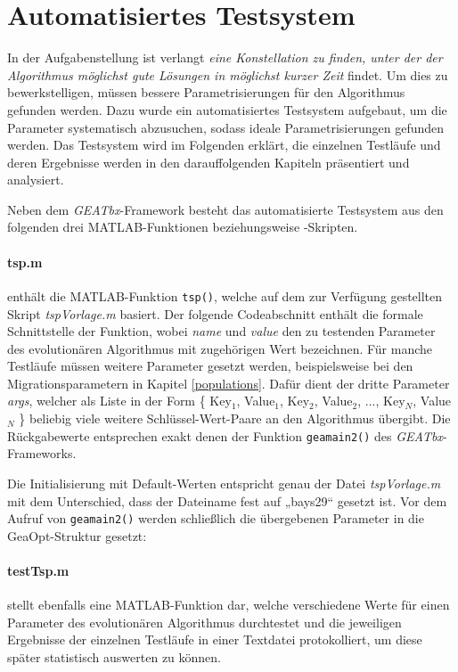 \section{Automatisiertes Testsystem}\label{testsystem}

In der Aufgabenstellung \citep{aufg} ist verlangt \emph{eine Konstellation zu finden,
unter der der Algorithmus möglichst gute Lösungen in möglichst kurzer Zeit} findet.
Um dies zu bewerkstelligen, müssen bessere Parametrisierungen für den Algorithmus
gefunden werden. Dazu wurde ein automatisiertes Testsystem aufgebaut, um
die Parameter systematisch abzusuchen, sodass ideale Parametrisierungen
gefunden werden. Das Testsystem wird im Folgenden erklärt, die einzelnen Testläufe
und deren Ergebnisse werden in den darauffolgenden Kapiteln präsentiert und
analysiert.

Neben dem \emph{GEATbx}-Framework besteht das automatisierte Testsystem aus den
folgenden drei MATLAB-Funktionen beziehungsweise -Skripten.


\paragraph{tsp.m} enthält die MATLAB-Funktion {\tt tsp()}, welche auf dem
zur Verfügung gestellten Skript \emph{tspVorlage.m} basiert. Der folgende
Codeabschnitt enthält die formale Schnittstelle der Funktion, wobei \emph{name}
und \emph{value} den zu testenden Parameter des evolutionären Algorithmus mit
zugehörigen Wert bezeichnen.
Für manche Testläufe müssen weitere Parameter gesetzt werden, beispielsweise
bei den Migrationsparametern in Kapitel \ref{populations}. Dafür dient der
dritte Parameter \emph{args}, welcher als Liste in der Form
\{ Key$_{1}$, Value$_{1}$, Key$_{2}$, Value$_{2}$, ..., Key$_{N}$, Value$_{N}$ \}
beliebig viele weitere Schlüssel-Wert-Paare an den Algorithmus übergibt.
Die Rückgabewerte entsprechen exakt denen der Funktion {\tt geamain2()} des
\emph{GEATbx}-Frameworks.



\noindent Die Initialisierung mit Default-Werten entspricht genau der Datei
\emph{tspVorlage.m} mit dem Unterschied, dass der Dateiname fest auf „bays29“
gesetzt ist. Vor dem Aufruf von {\tt geamain2()} werden schließlich die
übergebenen Parameter in die GeaOpt-Struktur gesetzt:



\paragraph{testTsp.m} stellt ebenfalls eine MATLAB-Funktion dar, welche
verschiedene Werte für einen Parameter des evolutionären Algorithmus durchtestet
und die jeweiligen Ergebnisse der einzelnen Testläufe in einer Textdatei
protokolliert, um diese später statistisch auswerten zu können.

